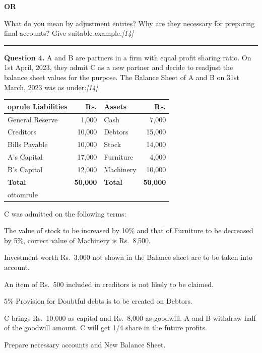 \documentclass[11pt,a4paper]{article}
\newcommand{\pts}[1]{\hfill   \textit{[#1]}}
\begin{document}
\centerline{   \textbf{OR}}

What do you mean by adjustment entries? Why are they necessary for preparing final accounts? Give suitable example.\pts{14}

\medskip\rule{\linewidth}{0.2pt}




\noindent   \textbf{Question 4.}
A and B are partners in a firm with equal profit sharing ratio. On 1st April, 2023, they admit C as a new partner and decide to readjust the balance sheet values for the purpose. The Balance Sheet of A and B on 31st March, 2023 was as under:\pts{14}


\begin{center}\small
  
\begin{tabular}{lr|lr}
     oprule
   \textbf{Liabilities} &   \textbf{Rs.} &   \textbf{Assets} &   \textbf{Rs.} \\
    \midrule
    General Reserve & 1,000 & Cash & 7,000 \\
    Creditors & 10,000 & Debtors & 15,000 \\
    Bills Payable & 10,000 & Stock & 14,000 \\
    A's Capital & 17,000 & Furniture & 4,000 \\
    B's Capital & 12,000 & Machinery & 10,000 \\
    \midrule
   \textbf{Total} &   \textbf{50,000} &   \textbf{Total} &   \textbf{50,000} \\
    ottomrule
  \end{tabular}
\end{center}




\noindent C was admitted on the following terms:

\begin{parts}
  \item The value of stock to be increased by 10\% and that of Furniture to be decreased by 5\%, correct value of Machinery is Rs.\ 8,500.
  \item Investment worth Rs.\ 3,000 not shown in the Balance sheet are to be taken into account.
  \item An item of Rs.\ 500 included in creditors is not likely to be claimed.
  \item 5\% Provision for Doubtful debts is to be created on Debtors.
  \item C brings Rs.\ 10,000 as capital and Rs.\ 8,000 as goodwill. A and B withdraw half of the goodwill amount. C will get 1/4 share in the future profits.
\end{parts}
Prepare necessary accounts and New Balance Sheet.
\end{document}
